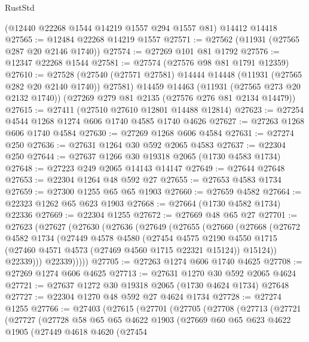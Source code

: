 \begin{lexlean}{RustStd}
\begin{coremodule}
    (@12440 @22268 @1544 @14219 @1557 @294 @1557 @81)
    @14412
    @14418
@27565 := @12484 @22268 @14219 @1557
@27571 := @27562 (@11931 (@27565 @287 @20 @2146 @1740))
@27574 := @27269 @101 @81 @1792
@27576 := @12347 @22268 @1544
@27581 := @27574 (@27576 @98 @81 @1791 @12359)
@27610 := @27528
    (@27540 (@27571 @27581) @14444 @14448 (@11931 (@27565 @282 @20 @2140 @1740)) @27581)
    @14459
    @14463
    (@11931 (@27565 @273 @20 @2132 @1740))
    (@27269 @279 @81 @2135 (@27576 @276 @81 @2134 @14479))
@27615 := @27411 (@27510 @27610 @12801 @14488 @12814)
@27623 := @27254 @4544 @1268 @1274 @606 @1740 @4585 @1740 @4626
@27627 := @27263 @1268 @606 @1740 @4584
@27630 := @27269 @1268 @606 @4584
@27631 := @27274 @250
@27636 := @27631 @1264 @30 @592 @2065 @4583
@27637 := @22304 @250
@27644 := @27637 @1266 @30 @19318 @2065 (@1730 @4583 @1734)
@27648 := @27223 @249 @2065 @14143 @14147
@27649 := @27644 @27648
@27653 := @22304 @1264 @48 @592 @27
@27655 := @27653 @4583 @1734
@27659 := @27300 @1255 @65 @65 @1903
@27660 := @27659 @4582
@27664 := @22323 @1262 @65 @623 @1903
@27668 := @27664 (@1730 @4582 @1734) @22336
@27669 := @22304 @1255
@27672 := @27669 @48 @65 @27
@27701 := @27623
    (@27627
      (@27630
        (@27636
          (@27649
            (@27655
              (@27660
                (@27668
                  (@27672
                    @4582
                    @1734
                    (@27449
                      @4578
                      @4580
                      (@27454
                        @4575
                        @2190
                        @4550
                        @1715
                        (@27460 @4571 @4573 (@27469 @4560 @1715 @22321 @15124))
                        @15124))
                    @22339)))
              @22339)))))
@27705 := @27263 @1274 @606 @1740 @4625
@27708 := @27269 @1274 @606 @4625
@27713 := @27631 @1270 @30 @592 @2065 @4624
@27721 := @27637 @1272 @30 @19318 @2065 (@1730 @4624 @1734) @27648
@27727 := @22304 @1270 @48 @592 @27 @4624 @1734
@27728 := @27274 @1255
@27766 := @27403
    (@27615
      (@27701
        (@27705
          (@27708
            (@27713
              (@27721
                (@27727
                  (@27728
                    @58
                    @65
                    @65
                    @4622
                    @1903
                    (@27669
                      @60
                      @65
                      @623
                      @4622
                      @1905
                      (@27449
                        @4618
                        @4620
                        (@27454

\end{coremodule}
\end{lexlean}
